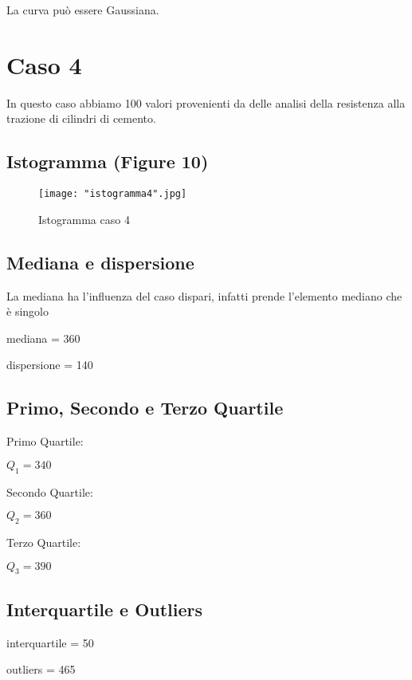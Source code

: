 \documentclass[a4paper]{article}
\begin{document}
La curva può essere Gaussiana.




\section{Caso 4}
In questo caso abbiamo 100 valori provenienti da delle analisi della resistenza alla trazione di cilindri di cemento.
\\

\subsection{Istogramma (Figure 10)}
\begin{figure}[htp]
	\centering
	\texttt{[image: "istogramma4".jpg]}
	\caption{Istogramma caso 4}
	\label{}
\end{figure}

\subsection{Mediana e dispersione}
La mediana ha l'influenza del caso dispari, infatti prende l'elemento mediano che è singolo 
\begin{center}
	mediana = 360
\end{center}
\begin{center}
	dispersione = 140
\end{center}
\subsection{Primo, Secondo e Terzo Quartile}
Primo Quartile:
\begin{center}
	$Q_1= 340$
\end{center}
Secondo Quartile:
\begin{center}
	$Q_2= 360$
\end{center}
Terzo Quartile:
\begin{center}
	$Q_3= 390$
\end{center}


\subsection{Interquartile e Outliers}
\begin{center}
	interquartile = 50
\end{center}
\begin{center}
	outliers = 465
\end{center}
\end{document}
